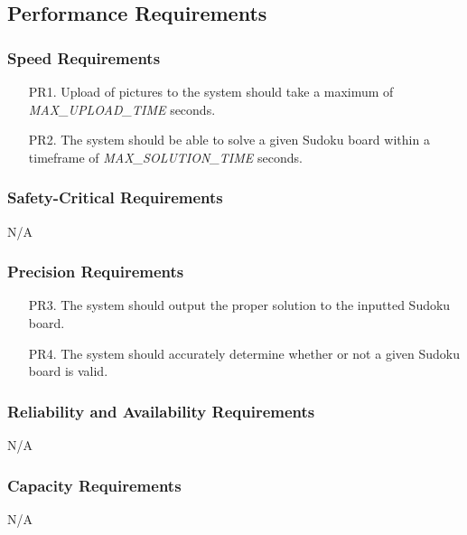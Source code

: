 \documentclass[11pt]{article}
\begin{document}
\subsection{Performance Requirements}

\subsubsection{Speed Requirements}

\begin{enumerate}
    \item [PR1.] Upload of pictures to the system should take a maximum of \emph{MAX\_UPLOAD\_TIME} seconds. %
    \item [PR2.] The system should be able to solve a given Sudoku board within a timeframe of \emph{MAX\_SOLUTION\_TIME} seconds. %
\end{enumerate}

\subsubsection{Safety-Critical Requirements}

N/A

\subsubsection{Precision Requirements}

\begin{enumerate}
    \item [PR3.] The system should output the proper solution to the inputted Sudoku board.
    \item [PR4.] The system should accurately determine whether or not a given Sudoku board is valid.
\end{enumerate}

\subsubsection{Reliability and Availability Requirements} %

N/A

\subsubsection{Capacity Requirements} %

N/A
\end{document}
